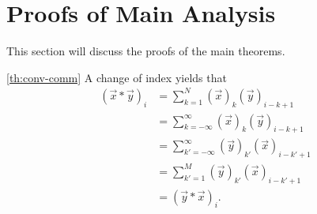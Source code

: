 \documentclass[a4paper, openany, oneside]{memoir}
\begin{document}
\section{Proofs of Main Analysis}
This section will discuss the proofs of the main theorems.

\begin{blockProofTheorem}{\ref{th:conv-comm}}
    A change of index yields that
    \begin{align*}
        (\vec{x} \ast \vec{y})_i &= \sum_{k=1}^{N} (\vec{x})_k (\vec{y})_{i-k+1} \\
        &= \sum_{k=-\infty}^{\infty} (\vec{x})_k (\vec{y})_{i-k+1} \\
        &= \sum_{k'=-\infty}^{\infty} (\vec{y})_{k'} (\vec{x})_{i-k'+1} \\
        &= \sum_{k'=1}^{M} (\vec{y})_{k'} (\vec{x})_{i-k'+1} \\
        &= (\vec{y} \ast \vec{x})_i.
    \end{align*}
\end{blockProofTheorem}
\end{document}
